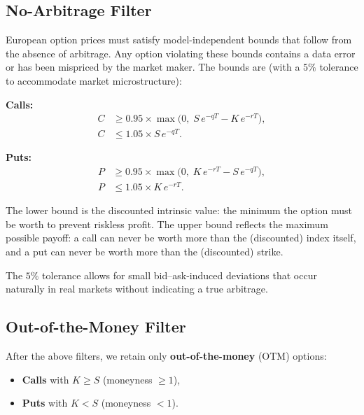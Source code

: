 \documentclass[12pt, a4paper]{article}
\begin{document}
\subsection{No-Arbitrage Filter}
\label{sec:noarb}

European option prices must satisfy model-independent bounds that follow from
the absence of arbitrage. Any option violating these bounds contains a data
error or has been mispriced by the market maker. The bounds are (with a $5\%$
tolerance to accommodate market microstructure):

\textbf{Calls:}
\begin{align}
    C &\geq 0.95 \times \max\!\big(0,\; S\,e^{-qT} - K\,e^{-rT}\big),
    \label{eq:call_lb} \\
    C &\leq 1.05 \times S\,e^{-qT}.
    \label{eq:call_ub}
\end{align}

\textbf{Puts:}
\begin{align}
    P &\geq 0.95 \times \max\!\big(0,\; K\,e^{-rT} - S\,e^{-qT}\big),
    \label{eq:put_lb} \\
    P &\leq 1.05 \times K\,e^{-rT}.
    \label{eq:put_ub}
\end{align}

The lower bound is the discounted intrinsic value: the minimum the option must
be worth to prevent riskless profit. The upper bound reflects the maximum
possible payoff: a call can never be worth more than the (discounted) index
itself, and a put can never be worth more than the (discounted) strike.

The $5\%$ tolerance allows for small bid--ask-induced deviations that occur
naturally in real markets without indicating a true arbitrage.

\subsection{Out-of-the-Money Filter}
\label{sec:otm}

After the above filters, we retain only \textbf{out-of-the-money} (OTM) options:
\begin{itemize}[nosep]
    \item \textbf{Calls} with $K \geq S$ (moneyness $\geq 1$),
    \item \textbf{Puts} with $K < S$ (moneyness $< 1$).
\end{itemize}
\end{document}
